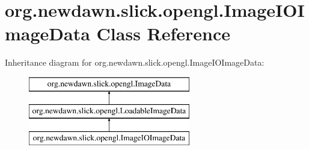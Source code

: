 \hypertarget{classorg_1_1newdawn_1_1slick_1_1opengl_1_1_image_i_o_image_data}{}\section{org.\+newdawn.\+slick.\+opengl.\+Image\+I\+O\+Image\+Data Class Reference}
\label{classorg_1_1newdawn_1_1slick_1_1opengl_1_1_image_i_o_image_data}
Inheritance diagram for org.\+newdawn.\+slick.\+opengl.\+Image\+I\+O\+Image\+Data\+:\begin{figure}[H]
\begin{center}
\leavevmode
\includegraphics[height=3.000000cm]{classorg_1_1newdawn_1_1slick_1_1opengl_1_1_image_i_o_image_data}
\end{center}
\end{figure}
